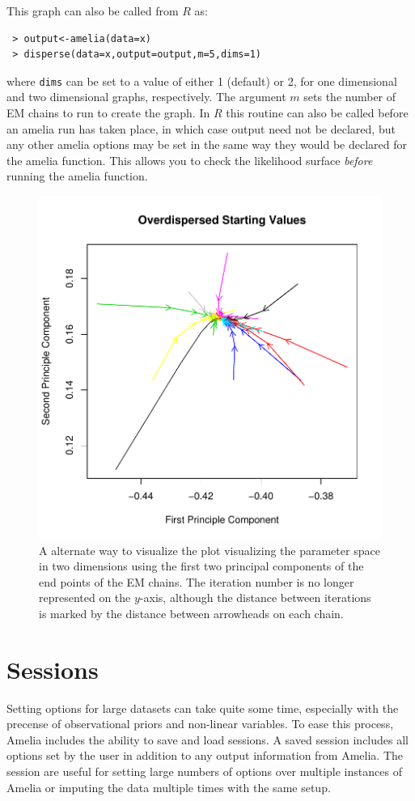 \documentclass[12pt,titlepage]{article}
\begin{document}
This graph can also be called from $R$ as:
\begin{verbatim}
 > output<-amelia(data=x) 
 > disperse(data=x,output=output,m=5,dims=1)
\end{verbatim}
where \texttt{dims} can be set to a value of either 1 (default) or 2,
for one dimensional and two dimensional graphs, respectively.  The
argument $m$ sets the number of EM chains to run to create the graph.
In $R$ this routine can also be called before an amelia run has taken
place, in which case output need not be declared, but any other amelia
options may be set in the same way they would be declared for the
amelia function.  This allows you to check the likelihood surface
\emph{before} running the amelia function.
\begin{figure}
  \centering \includegraphics[scale=.7]{overdis2d}
  \caption{ A alternate way to visualize the plot visualizing the
    parameter space in two dimensions using the first two principal
    components of the end points of the EM chains.  The iteration
    number is no longer represented on the $y$-axis, although the
    distance between iterations is marked by the distance between
    arrowheads on each chain.}
\end{figure}

\section{Sessions}
\label{sec:sessions}
Setting options for large datasets can take quite some time, especially
with the precense of observational priors and non-linear variables.  To
ease this process, Amelia includes the ability to save and load sessions.
A saved session includes all options set by the user in addition to any
output information from Amelia.  The session are useful for setting large
numbers of options over multiple instances of Amelia or imputing the data
multiple times with the same setup.   
\end{document}
